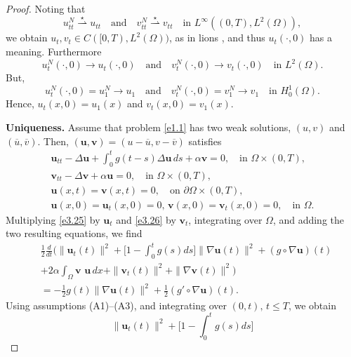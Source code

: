 \documentclass[reqno]{amsart}
\begin{document}
\begin{proof}
Noting that
\[
 u_{tt}^{N} \overset{\star}{\rightharpoonup} u_{tt} \quad \text{and} \quad
 v_{tt}^{N} \overset{\star}{\rightharpoonup} v_{tt} \quad \text{in }
 L^\infty((0,T), L^2(\Omega)),
\]
we obtain $ u_t , v_{t} \in C([0, T), L^2(\Omega))$, as in lions \cite{Lions},
and thus \( u_t(\cdot, 0) \) has a meaning. Furthermore
\[
u^N_t(\cdot, 0) \to u_t(\cdot, 0) \quad \text{and} \quad
v^N_t(\cdot, 0) \to v_t(\cdot, 0) \quad\text{in } L^2(\Omega).
\]
But,
\[ u^N_t(\cdot, 0) = u^N_1 \to u_1 \quad \text{and} \quad
 v^N_t(\cdot, 0) = v^N_1 \to v_1 \quad \text{in } H^1_0(\Omega).
\]
Hence,
$u_t(x, 0) = u_1(x)$ and $v_t(x, 0) = v_1(x)$.
\smallskip

\noindent\textbf{Uniqueness.}
Assume that problem \eqref{e1.1} has two weak solutions, \( (u, v) \) and
\( (\overline{u},\overline{v}) \). Then,
\( (\mathbf{u}, \mathbf{v}) = (u - \overline{u}, v - \overline{v}) \) satisfies
\begin{gather}
 \mathbf{u}_{tt} - \Delta \mathbf{u} + \int_0^t g(t-s) \Delta \mathbf{u} \, ds
 + \alpha \mathbf{v} = 0, \quad \text{in } \Omega \times (0, T), \label{e3.25}\\
 \mathbf{v}_{tt} - \Delta \mathbf{v} + \alpha \mathbf{u} = 0, \quad
 \text{in } \Omega \times (0, T), \label{e3.26} \\
 \mathbf{u}(x,t) = \mathbf{v}(x,t) = 0, \quad \text{on } \partial\Omega \times (0, T),
 \label{e3.27}\\
 \mathbf{u}(x,0) = \mathbf{u}_t(x,0) =0,\, \mathbf{v}(x,0)=\mathbf{v}_t(x,0) = 0,
 \quad \text{in } \Omega. \label{e3.28}
\end{gather}
Multiplying \eqref{e3.25} by $\mathbf{u}_{t}$ and \eqref{e3.26} by $\mathbf{v}_{t}$,
integrating over $\Omega$, and adding the two resulting equations, we find
\begin{equation}
\begin{aligned}
&\frac{1}{2}\frac{d}{dt} \Big( \| \mathbf{u}_{t}(t) \| ^2
 + \Big[ 1-\int_0^t g(s) ds \Big] \| \nabla \mathbf{u} (t)\|^2
 +(g\circ \nabla \mathbf{u})(t) \\
&+2 \alpha \int_\Omega \mathbf{v}\textbf{ u}\,dx
 +\| \mathbf{v}_{t}(t) \|^2 + \| \nabla \mathbf{v} (t)\|^2 \Big)\\
& = -\frac{1}{2} g(t)\parallel \nabla \mathbf{u}(t) \parallel^2
 + \frac{1}{2}( g'\circ\nabla \mathbf{u}) (t).
\end{aligned} \label{e3.29}
\end{equation}
Using assumptions (A1)--(A3), and integrating over $(0, t),\, t\leq T$, we obtain
\[
 \| \mathbf{u}_{t}(t) \| ^2+ \Big[ 1-\int_0^t g(s) ds \Big]
\]
\end{proof}
\end{document}
